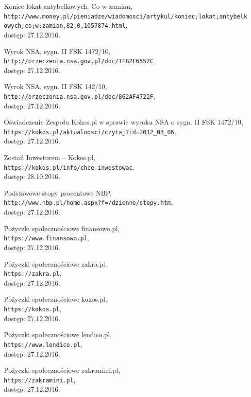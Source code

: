 \documentclass[a4paper,twoside,titlepage,openright]{book}
\begin{document}
\begin{thebibliography}{99}
 Koniec lokat antybelkowych. Co w zamian, \\
\texttt{http://www.money.pl/pieniadze/wiadomosci/artykul/koniec;lokat;antybelkowych;co;w;zamian,82,0,1057874.html}, \\dostęp: 27.12.2016.

 Wyrok NSA, sygn. II FSK 1472/10, \\
\texttt{http://orzeczenia.nsa.gov.pl/doc/1F82F6552C}, \\dostęp: 27.12.2016.

 Wyrok NSA, sygn. II FSK 142/10, \\
\texttt{http://orzeczenia.nsa.gov.pl/doc/862AF4722F}, \\dostęp: 27.12.2016.

 Oświadczenie Zespołu Kokos.pl w sprawie wyroku NSA o sygn. II FSK 1472/10, \\
\texttt{https://kokos.pl/aktualnosci/czytaj?id=2012\_03\_06}, \\dostęp: 27.12.2016.

 Zostań Inwestorem -- Kokos.pl, \\
\texttt{https://kokos.pl/info/chce-inwestowac}, \\dostęp: 28.10.2016.

 Podstawowe stopy procentowe NBP, \\
\texttt{http://www.nbp.pl/home.aspx?f=/dzienne/stopy.htm}, \\dostęp: 27.12.2016.

 Pożyczki społecznościowe finansowo.pl, \\
\texttt{https://www.finansowo.pl}, \\dostęp: 27.12.2016.

 Pożyczki społecznościowe zakra.pl, \\
\texttt{https://zakra.pl}, \\dostęp: 27.12.2016.

 Pożyczki społecznościowe kokos.pl, \\
\texttt{https://kokos.pl}, \\dostęp: 27.12.2016.

 Pożyczki społecznościowe lendico.pl, \\
\texttt{https://www.lendico.pl}, \\dostęp: 27.12.2016.

 Pożyczki społecznościowe zakramini.pl, \\
\texttt{https://zakramini.pl}, \\dostęp: 27.12.2016.


\end{thebibliography}
\end{document}
